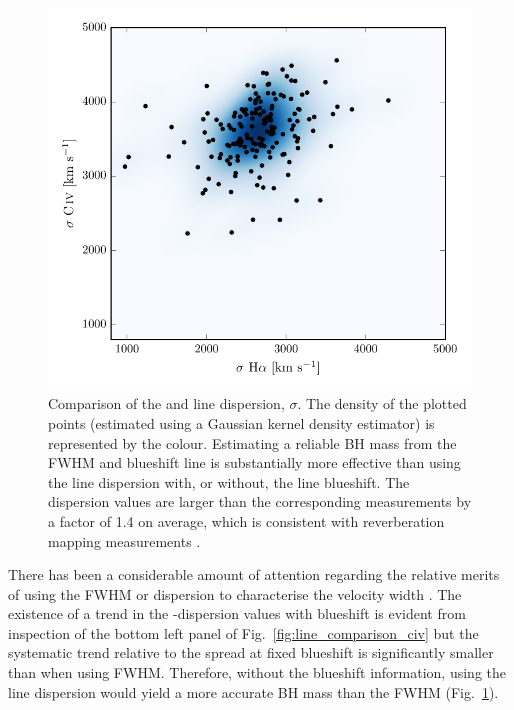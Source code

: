 \begin{figure}
    \centering 
    \includegraphics[width=0.8\columnwidth]{figures/chapter03/dispersion_comparison.pdf} 
    \caption[{Comparison of the  and \ha line dispersion, $\sigma$.}]{Comparison of the  and \ha line dispersion, $\sigma$. The density of the plotted points (estimated using a Gaussian kernel density estimator) is represented by the colour. Estimating a reliable BH mass from the  FWHM and blueshift line is substantially more effective than using the  line dispersion with, or without, the line blueshift. The  dispersion values are larger than the corresponding \ha measurements by a factor of 1.4 on average, which is consistent with reverberation mapping measurements \citep{vestergaard06}.} 
    \label{fig:dispersion_comparison}
\end{figure}

There has been a considerable amount of attention regarding the relative merits of using the FWHM or dispersion to characterise the velocity width \citep[e.g.][]{denney13}.
The existence of a trend in the -dispersion values with  blueshift is evident from inspection of the bottom left panel of Fig.~\ref{fig:line_comparison_civ} but the systematic trend relative to the spread at fixed blueshift is significantly smaller than when using  FWHM. 
Therefore, without the blueshift information, using the line dispersion would yield a more accurate BH mass than the FWHM (Fig.~\ref{fig:dispersion_comparison}). 

